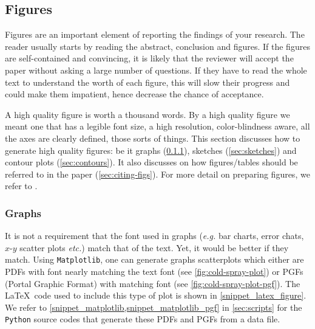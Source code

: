 \documentclass[authoryear,3p,times,preprint,review,fleqn]{elsarticle}
\makeatletter
\newcommand{\eg}{\textit{e.g.}\xspace}
\newcommand{\etc}{\textit{etc.}\@\xspace}
\numberwithin{equation}{section}
\theoremstyle{remark}
\makeatother
\begin{document}
\subsection{Figures}\label{sec:figs}


Figures are an important element of reporting the findings of your research. The reader usually starts by reading the abstract, conclusion and figures. If the figures are self-contained and convincing, it is likely that the reviewer will accept the paper without asking a large number of questions. If they have to read the whole text to understand the worth of each figure, this will slow their progress and could make them impatient, hence decrease the chance of acceptance. 

A high quality figure is worth a thousand words. By a high quality figure we meant one that has a legible font size, a high resolution, color-blindness aware, all the axes are clearly defined, those sorts of things. 
This section discusses how to generate high quality figures: be it graphs (\cref{sec:graphs}), sketches (\cref{sec:sketches}) and contour plots (\cref{sec:contours}). It also discusses on how figures/tables should be referred to in the paper (\cref{sec:citing-figs}). For more detail on preparing figures, we refer to \cite{rougier2014ten}.


\subsubsection{Graphs}\label{sec:graphs}

It is not a requirement that the font used in  graphs (\eg bar charts, error chats, $x\text{-}y$ scatter plots \etc)  match that of the text. Yet, it would be better if they match. Using  \texttt{Matplotlib}, one can generate graphs scatterplots which either are PDFs with font nearly matching the text font  (see \cref{fig:cold-spray-plot}) or PGFs (Portal Graphic Format) with matching font (see \cref{fig:cold-spray-plot-pgf}).  The \LaTeX\ code used to include this type of plot  is shown in \cref{snippet_latex_figure}. We refer to \cref{snippet_matplotlib,snippet_matplotlib_pgf} in \cref{sec:scripts} for the \texttt{Python} source codes that generate these PDFs and PGFs from a data file.
\end{document}
